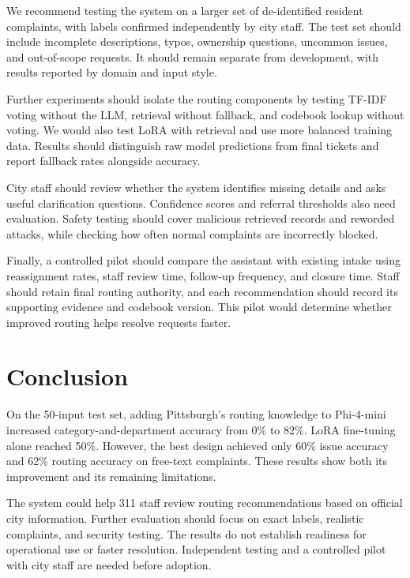 \documentclass[11pt,letterpaper]{article}
\begin{document}
We recommend testing the system on a larger set of de-identified resident complaints, with labels confirmed independently by city staff. The test set should include incomplete descriptions, typos, ownership questions, uncommon issues, and out-of-scope requests. It should remain separate from development, with results reported by domain and input style.

Further experiments should isolate the routing components by testing TF-IDF voting without the LLM, retrieval without fallback, and codebook lookup without voting. We would also test LoRA with retrieval and use more balanced training data. Results should distinguish raw model predictions from final tickets and report fallback rates alongside accuracy.

City staff should review whether the system identifies missing details and asks useful clarification questions. Confidence scores and referral thresholds also need evaluation. Safety testing should cover malicious retrieved records and reworded attacks, while checking how often normal complaints are incorrectly blocked.

Finally, a controlled pilot should compare the assistant with existing intake using reassignment rates, staff review time, follow-up frequency, and closure time. Staff should retain final routing authority, and each recommendation should record its supporting evidence and codebook version. This pilot would determine whether improved routing helps resolve requests faster.

\section{Conclusion}

On the 50-input test set, adding Pittsburgh's routing knowledge to Phi-4-mini increased category-and-department accuracy from 0\% to 82\%. LoRA fine-tuning alone reached 50\%. However, the best design achieved only 60\% issue accuracy and 62\% routing accuracy on free-text complaints. These results show both its improvement and its remaining limitations.

The system could help 311 staff review routing recommendations based on official city information. Further evaluation should focus on exact labels, realistic complaints, and security testing. The results do not establish readiness for operational use or faster resolution. Independent testing and a controlled pilot with city staff are needed before adoption.
\end{document}
